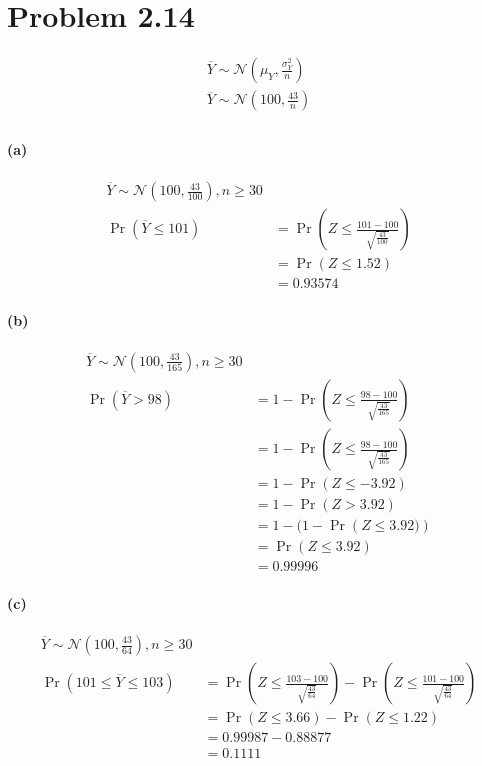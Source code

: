 \documentclass[10pt,letter]{article}
\begin{document}
\section*{Problem 2.14}

\begin{align*}
\overline{Y} \sim \mathcal{N}\left(\mu_Y, \frac{\sigma_{Y}^2}{n}  \right)\\
\overline{Y} \sim \mathcal{N}\left(100, \frac{43}{n}  \right)\\
\end{align*}
\paragraph{(a)}
\begin{align*}
\overline{Y} \sim \mathcal{N}\left(100, \frac{43}{100}\right), n\geq 30\\
\Pr(\overline{Y} \leq 101) &= \Pr \left(Z\leq\frac{101-100}{\sqrt{\frac{43}{100}}}\right)\\
&= \Pr \left(Z\leq 1.52\right)\\
&= 0.93574
\end{align*}

\paragraph{(b)}
\begin{align*}
\overline{Y} \sim \mathcal{N}\left(100, \frac{43}{165}\right), n\geq 30\\
\Pr(\overline{Y} > 98) &= 1 - \Pr \left(Z\leq\frac{98-100}{\sqrt{\frac{43}{165}}}\right)\\
&= 1 - \Pr \left(Z\leq\frac{98-100}{\sqrt{\frac{43}{165}}}\right)\\
&= 1 - \Pr \left(Z\leq -3.92\right)\\
&= 1 - \Pr \left(Z > 3.92\right)\\
&= 1 - (1 - \Pr \left(Z \leq 3.92)\right)\\
&=\Pr \left(Z \leq 3.92\right)\\
&=0.99996
\end{align*}

\paragraph{(c)}
\begin{align*}
\overline{Y} \sim \mathcal{N}\left(100, \frac{43}{64}\right), n\geq 30\\
\Pr(101\leq\overline{Y} \leq 103) &= \Pr \left(Z\leq\frac{103-100}{\sqrt{\frac{43}{64}}}\right) - \Pr \left(Z\leq\frac{101-100}{\sqrt{\frac{43}{64}}}\right)\\
&= \Pr \left(Z\leq 3.66\right) - \Pr \left(Z\leq 1.22\right)\\
&=0.99987-0.88877\\
&=0.1111\\
\end{align*}
\end{document}
